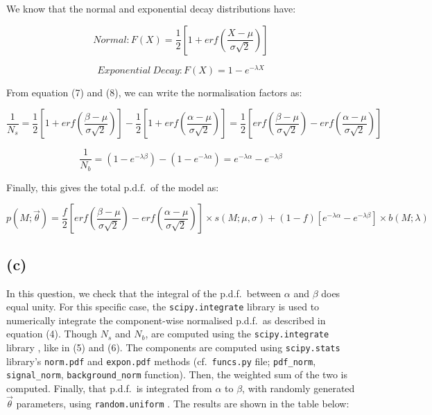 \documentclass[12pt]{report} %
\begin{document}
\vspace*{1\baselineskip}
We know that the normal and exponential decay distributions have:  

\begin{equation}
    Normal: \displaystyle F(X) = \frac{1}{2}[1 + erf(\frac{X - \mu}{\sigma\sqrt{2}})]
\end{equation}  

\begin{equation}
    Exponential\ Decay: \displaystyle F(X) = 1 - e^{-\lambda X}
\end{equation}  

\vspace*{1\baselineskip}
From equation (7) and (8), we can write the normalisation factors as:

\begin{equation}
    \frac{1}{N_{s}} = \frac{1}{2}[1 + erf(\frac{\beta - \mu}{\sigma\sqrt{2}})] - \frac{1}{2}[1 + erf(\frac{\alpha - \mu}{\sigma\sqrt{2}})] = \frac{1}{2}[erf(\frac{\beta - \mu}{\sigma\sqrt{2}}) - erf(\frac{\alpha - \mu}{\sigma\sqrt{2}})]
\end{equation}

\begin{equation}
    \frac{1}{N_{b}} = (1 - e^{-\lambda \beta}) - (1 - e^{-\lambda \alpha}) = e^{-\lambda \alpha} - e^{-\lambda \beta}
\end{equation}

\vspace*{1\baselineskip}
Finally, this gives the total p.d.f.\ of the model as:

\begin{equation}
    p(M;\vec{\theta}) = \frac{f}{2}[erf(\frac{\beta - \mu}{\sigma\sqrt{2}}) - erf(\frac{\alpha - \mu}{\sigma\sqrt{2}})] \times s(M;\mu,\sigma) + (1 - f)[e^{-\lambda \alpha} - e^{-\lambda \beta}] \times b(M;\lambda)
\end{equation}

\subsection*{(c)}

In this question, we check that the integral of the p.d.f.\ between $\alpha$ and $\beta$ does equal unity. For this specific case, the \texttt{scipy.integrate} library \cite{scipy-integrate} is used to numerically integrate the component-wise normalised p.d.f.\ as described in equation (4). Though $N_{s}$ and $N_{b}$, are computed using the \texttt{scipy.integrate} library \cite{scipy-integrate}, like in (5) and (6). The components are computed using \texttt{scipy.stats} library's \texttt{norm.pdf} and \texttt{expon.pdf} methods \cite{scipy-stats} (cf.\ \texttt{funcs.py} file; \texttt{pdf\_norm}, \texttt{signal\_norm}, \texttt{background\_norm} function). Then, the weighted sum of the two is computed. Finally, that p.d.f.\ is integrated from $\alpha$ to $\beta$, with randomly generated $\vec{\theta}$ parameters, using \texttt{random.uniform} \cite{python-random}. The results are shown in the table below:
\end{document}
